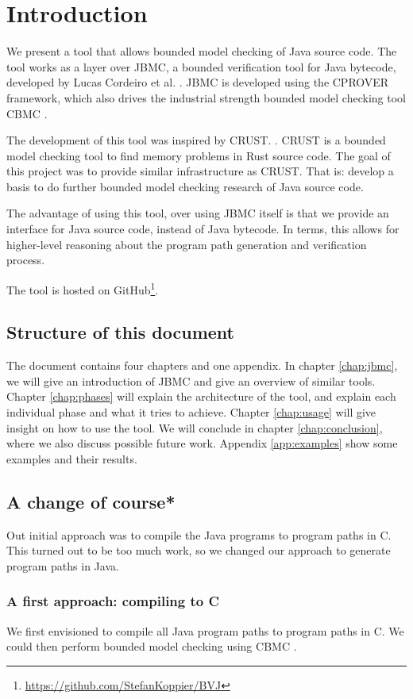 \chapter*{Introduction}
We present a tool that allows bounded model checking of Java source code. The
tool works as a layer over JBMC, a bounded verification tool for Java bytecode, 
developed by Lucas Cordeiro et al. \cite{ckkst2018}. JBMC is developed using 
the CPROVER framework, which also drives the industrial strength bounded model 
checking tool CBMC \cite{ckl2004}.

The development of this tool was inspired by CRUST. \cite{toman2015crust}. CRUST 
is a bounded model checking tool to find memory problems in Rust source code. The
goal of this project was to provide similar infrastructure as CRUST. That is: develop
a basis to do further bounded model checking research of Java source code.

The advantage of using this tool, over using JBMC itself is that we provide an 
interface for Java source code, instead of Java bytecode. In terms, this allows for
higher-level reasoning about the program path generation and verification process.

The tool is hosted on GitHub\footnote{\url{https://github.com/StefanKoppier/BVJ}}.

\section*{Structure of this document}
The document contains four chapters and one appendix. In chapter 
\ref{chap:jbmc}, we will give an introduction of JBMC and give an overview of 
similar tools. Chapter 
\ref{chap:phases} will explain the architecture of the tool, and explain each
individual phase and what it tries to achieve. Chapter \ref{chap:usage} will
give insight on how to use the tool. We will conclude in chapter \ref{chap:conclusion},
where we also discuss possible future work. Appendix \ref{app:examples} show some
examples and their results.

\section*{A change of course*}
Out initial approach was to compile the Java programs to program paths in C. This
turned out to be too much work, so we changed our approach to generate program 
paths in Java.

\subsection*{A first approach: compiling to C}
We first envisioned to compile all Java program paths to program paths in C. 
We could then perform bounded model checking using CBMC \cite{ckl2004}. 

